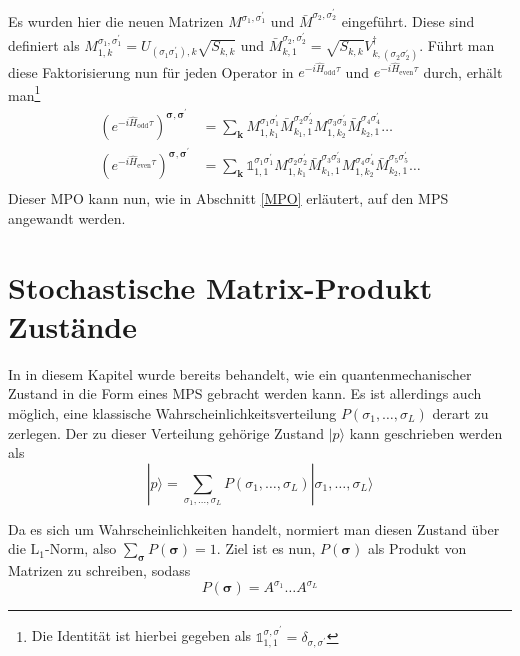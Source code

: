 \documentclass[10pt,a4paper]{report}
\newcommand{\SumIndex}{\sigma_1,\ldots,\sigma_L}
\begin{document}
Es wurden hier die neuen Matrizen $M^{\sigma_1,\sigma_1^{\prime}}$ und $\bar{M}^{\sigma_2,\sigma_2^{\prime}}$ eingeführt. Diese sind definiert als $M_{1,k}^{\sigma_1,\sigma_1^{\prime}}=U_{(\sigma_1 \sigma_1^\prime),k}\sqrt{S_{k,k}}$ und $\bar{M}_{k,1}^{\sigma_2,\sigma_2^{\prime}}=\sqrt{S_{k,k}}V_{k,(\sigma_2 \sigma_2^\prime)}^\dagger$. Führt man diese Faktorisierung nun für jeden Operator in $e^{-i\hat{H}_{\text{odd}}\tau}$ und $e^{-i\hat{H}_{\text{even}}\tau}$ durch, erhält man\footnote{Die Identität ist hierbei gegeben als $\mathbb{1}_{1,1}^{\sigma,\sigma^{\prime}}=\delta_{\sigma,\sigma^{\prime}}$}
\begin{equation}
\begin{split}
(e^{-i\hat{H}_{\text{odd}}\tau})^{\bm{\sigma},\bm{\sigma^\prime}}&=\sum_{\textbf{k}}M_{1,k_1}^{\sigma_1 \sigma_1^\prime} \bar{M}_{k_1,1}^{\sigma_2 \sigma_2^\prime}M_{1,k_2}^{\sigma_3 \sigma_3^\prime} \bar{M}_{k_2,1}^{\sigma_4 \sigma_4^\prime}\ldots\\
(e^{-i\hat{H}_{\text{even}}\tau})^{\bm{\sigma},\bm{\sigma^\prime}}&=\sum_{\textbf{k}}\mathbb{1}_{1,1}^{\sigma_1 \sigma_1^\prime} M_{1,k_1}^{\sigma_2 \sigma_2^\prime}\bar{M}_{k_1,1}^{\sigma_3 \sigma_3^\prime} M_{1,k_2}^{\sigma_4 \sigma_4^\prime}\bar{M}_{k_2,1}^{\sigma_5 \sigma_5^\prime}\ldots\\
\end{split}
\end{equation}
Dieser MPO kann nun, wie in Abschnitt \ref{MPO} erläutert, auf den MPS angewandt werden.

\section{Stochastische Matrix-Produkt Zustände}
In in diesem Kapitel wurde bereits behandelt, wie ein quantenmechanischer Zustand in die Form eines MPS gebracht werden kann. Es ist allerdings auch möglich, eine klassische Wahrscheinlichkeitsverteilung $P(\SumIndex)$ derart zu zerlegen. Der zu dieser Verteilung gehörige Zustand $|p\rangle$ kann geschrieben werden als
\begin{equation}
|p\rangle=\sum_{\SumIndex}P(\SumIndex)|\SumIndex\rangle
\end{equation}

Da es sich um Wahrscheinlichkeiten handelt, normiert man diesen Zustand über die $\text{L}_1$-Norm, also $\sum_{\bm{\sigma}}P(\bm{\sigma})=1$. Ziel ist es nun, $P(\bm{\sigma})$ als Produkt von Matrizen zu schreiben, sodass
\begin{equation}
P(\bm{\sigma})=A^{\sigma_1}\ldots A^{\sigma_L}
\end{equation}
\end{document}

